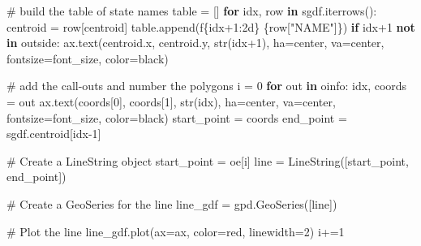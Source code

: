 \documentclass[
  a4paper, 
  twoside,
  final
]{article}
\newenvironment{Shaded}{\begin{snugshade}}{\end{snugshade}}
\newcommand{\BuiltInTok}[1]{\textcolor[rgb]{0.00,0.23,0.31}{#1}}
\newcommand{\CommentTok}[1]{\textcolor[rgb]{0.37,0.37,0.37}{#1}}
\newcommand{\ControlFlowTok}[1]{\textcolor[rgb]{0.00,0.23,0.31}{\textbf{#1}}}
\newcommand{\DecValTok}[1]{\textcolor[rgb]{0.68,0.00,0.00}{#1}}
\newcommand{\KeywordTok}[1]{\textcolor[rgb]{0.00,0.23,0.31}{\textbf{#1}}}
\newcommand{\NormalTok}[1]{\textcolor[rgb]{0.00,0.23,0.31}{#1}}
\newcommand{\OperatorTok}[1]{\textcolor[rgb]{0.37,0.37,0.37}{#1}}
\newcommand{\SpecialCharTok}[1]{\textcolor[rgb]{0.37,0.37,0.37}{#1}}
\newcommand{\SpecialStringTok}[1]{\textcolor[rgb]{0.13,0.47,0.30}{#1}}
\newcommand{\StringTok}[1]{\textcolor[rgb]{0.13,0.47,0.30}{#1}}
\begin{document}
\begin{Shaded}
\begin{Highlighting}[]
\CommentTok{\# build the table of state names}
\NormalTok{table }\OperatorTok{=}\NormalTok{ []}
\ControlFlowTok{for}\NormalTok{ idx, row }\KeywordTok{in}\NormalTok{ sgdf.iterrows():}
\NormalTok{    centroid }\OperatorTok{=}\NormalTok{ row[}\StringTok{\textquotesingle{}centroid\textquotesingle{}}\NormalTok{]}
\NormalTok{    table.append(}\SpecialStringTok{f\textquotesingle{}}\SpecialCharTok{\{}\NormalTok{idx}\OperatorTok{+}\DecValTok{1}\SpecialCharTok{:2d\}}\SpecialStringTok{ }\SpecialCharTok{\{}\NormalTok{row[}\StringTok{"NAME"}\NormalTok{]}\SpecialCharTok{\}}\SpecialStringTok{\textquotesingle{}}\NormalTok{)}
    \ControlFlowTok{if}\NormalTok{ idx}\OperatorTok{+}\DecValTok{1} \KeywordTok{not} \KeywordTok{in}\NormalTok{ outside:}
\NormalTok{        ax.text(centroid.x, centroid.y, }\BuiltInTok{str}\NormalTok{(idx}\OperatorTok{+}\DecValTok{1}\NormalTok{), ha}\OperatorTok{=}\StringTok{\textquotesingle{}center\textquotesingle{}}\NormalTok{,}
\NormalTok{                va}\OperatorTok{=}\StringTok{\textquotesingle{}center\textquotesingle{}}\NormalTok{, fontsize}\OperatorTok{=}\NormalTok{font\_size, color}\OperatorTok{=}\StringTok{\textquotesingle{}black\textquotesingle{}}\NormalTok{)}

\CommentTok{\# add the call{-}outs and number the polygons}
\NormalTok{i }\OperatorTok{=} \DecValTok{0}
\ControlFlowTok{for}\NormalTok{ out }\KeywordTok{in}\NormalTok{ oinfo:}
\NormalTok{    idx, coords }\OperatorTok{=}\NormalTok{ out}
\NormalTok{    ax.text(coords[}\DecValTok{0}\NormalTok{], coords[}\DecValTok{1}\NormalTok{], }\BuiltInTok{str}\NormalTok{(idx), ha}\OperatorTok{=}\StringTok{\textquotesingle{}center\textquotesingle{}}\NormalTok{,}
\NormalTok{            va}\OperatorTok{=}\StringTok{\textquotesingle{}center\textquotesingle{}}\NormalTok{, fontsize}\OperatorTok{=}\NormalTok{font\_size, color}\OperatorTok{=}\StringTok{\textquotesingle{}black\textquotesingle{}}\NormalTok{)}
\NormalTok{    start\_point }\OperatorTok{=}\NormalTok{ coords}
\NormalTok{    end\_point }\OperatorTok{=}\NormalTok{ sgdf.centroid[idx}\OperatorTok{{-}}\DecValTok{1}\NormalTok{]}

    \CommentTok{\# Create a LineString object}
\NormalTok{    start\_point }\OperatorTok{=}\NormalTok{ oe[i]}
\NormalTok{    line }\OperatorTok{=}\NormalTok{ LineString([start\_point, end\_point])}
    
    \CommentTok{\# Create a GeoSeries for the line}
\NormalTok{    line\_gdf }\OperatorTok{=}\NormalTok{ gpd.GeoSeries([line])}
    
    \CommentTok{\# Plot the line}
\NormalTok{    line\_gdf.plot(ax}\OperatorTok{=}\NormalTok{ax, color}\OperatorTok{=}\StringTok{\textquotesingle{}red\textquotesingle{}}\NormalTok{, linewidth}\OperatorTok{=}\DecValTok{2}\NormalTok{)}
\NormalTok{    i}\OperatorTok{+=}\DecValTok{1}


\end{Highlighting}
\end{Shaded}
\end{document}

